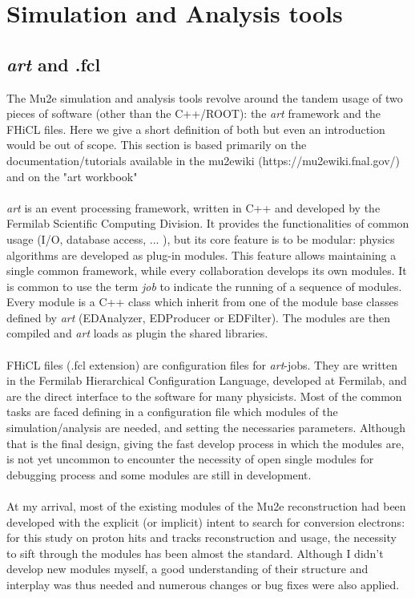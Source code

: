 \documentclass[12pt,a4paper,openright, oneside, titlepage]{book} %
\begin{document}
\section{Simulation and Analysis tools}
\subsection{\textit{art} and .fcl}
The Mu2e simulation and analysis tools revolve around the tandem usage of two pieces of software (other than the C++/ROOT): the \textit{art} framework and the FHiCL files. Here we give a short definition of both but even an introduction would be out of scope. This section is based primarily on the documentation/tutorials available in the mu2ewiki (https://mu2ewiki.fnal.gov/) and on the "art workbook"\cite{art}\\ \\
\textit{art} is an event processing framework, written in C++ and developed by the Fermilab Scientific Computing Division. It provides the functionalities of common usage (I/O, database access, ... ), but its core feature is to be modular: physics algorithms are developed as plug-in modules. This feature allows maintaining a single common framework, while every collaboration develops its own modules. It is common to use the term \textit{job} to indicate the running of a sequence of modules.   
Every module is a C++ class which inherit from one of the module base classes defined by \textit{art} (EDAnalyzer, EDProducer or EDFilter). The modules are then compiled and \textit{art} loads as plugin the shared libraries.\\ \\
FHiCL files (.fcl extension) are configuration files for \textit{art}-jobs. They are written in the Fermilab Hierarchical Configuration Language, developed at Fermilab, and are the direct interface to the software for many physicists. Most of the common tasks are faced defining in a configuration file which modules of the simulation/analysis are needed, and setting the necessaries parameters. Although that is the final design, giving the fast develop process in which the modules are, is not yet uncommon to encounter the necessity of open single modules for debugging process and some modules are still in development.\\ \\
At my arrival, most of the existing modules of the Mu2e reconstruction had been developed with the explicit (or implicit) intent 
to search for conversion electrons: for this study on proton hits and tracks reconstruction and usage, the necessity to sift through the modules has been almost the standard. Although I didn't develop new modules myself, a good understanding of their structure and interplay was thus needed and numerous changes or bug fixes were also applied.
\end{document}
